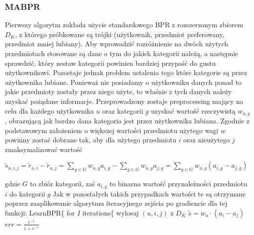 \documentclass{pracamgr}
\begin{document}
    \subsubsection{MABPR}
     Pierwszy algorytm zakłada użycie standardowego BPR z rozszerzonym zbiorem $D_K$, z którego próbkowane są trójki
     (użytkownik, przedmiot preferowany, przedmiot mniej lubiany).
     Aby wprowadzić rozróżnienie na dwóch użytych przedmiotach stosowane są dane o tym do jakich kategorii należą,
     a następnie sprawdzić, który zestaw kategorii powinien bardziej przypaść do gustu użytkownikowi.
     Pozostaje jednak problem ustalenia tego które kategorie są przez użytkownika lubiane.
     Ponieważ nie posiadamy o użytkowniku danych ponad to jakie przedmioty zostały przez niego użyte, to właśnie z tych danych należy uzyskać
     pożądane informacje.
     Przeprowadzony zostaje preprocessing mający na celu dla każdego użytkownika $u$ oraz kategorii $g$ uzyskać
     wartość rzeczywistą $w_{u,g}$, obrazującą jak bardzo dana kategoria jest przez użytkownika lubiana.
     Zgodnie z podstawowym założeniem o większej wartości przedmiotu użytego wagi $w$ powinny zostać dobrane tak,
     aby dla użytego przedmiotu $i$ oraz nieużytego $j$ zmaksymalizować wartość
     \begin{center}
      $\tilde{s}_{u,i,j}=\tilde{r}_{u,i}-\tilde{r}_{u,j}=\sum\limits_{g\in G}w_{u,g}a_{i,g}-\sum\limits_{g\in G}w_{u,g}a_{j,g}
      =\sum\limits_{g\in G}w_{u,g}(a_{i,g}-a_{j,g})$
     \end{center}
     {\scriptsize
      gdzie $G$ to zbiór kategorii, zaś $a_{i,g}$ to binarna wartość przynależności przedmiotu $i$ do kategorii $g$
     }\newline
     Jak w pozostałych takich przypadkach wartości te są otrzymane poprzez zaaplikowanie algorytmu iteracyjnego zejścia po gradiencie dla tej funkcji:\newline
     \hspace*{0pt} LearnBPR\{\newline
     \hspace*{16pt}	for $I$ iterations\{\newline
     \hspace*{32pt}		wylosuj $(u,i,j)$ z $D_K$\newline 
     \hspace*{32pt}		$\tilde{s}=w_u\cdot(a_i-a_j)$\newline
     \hspace*{32pt}		$err=\frac{e^{-\tilde{s}}}{1+e^{-\tilde{s}}}$\newline
\end{document}
